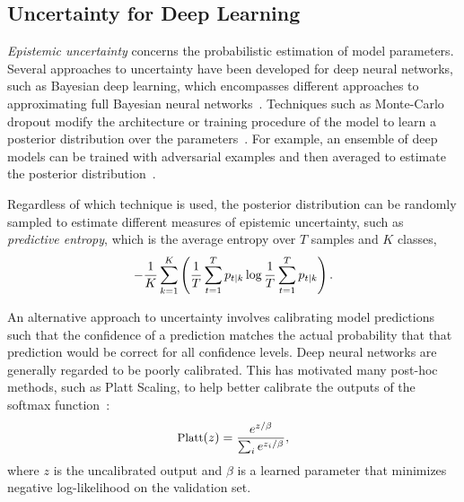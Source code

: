 \documentclass[letterpaper]{article} %
\begin{document}
    \subsection{Uncertainty for Deep Learning}
        \textit{Epistemic uncertainty} concerns the probabilistic estimation of model parameters.
        Several approaches to uncertainty have been developed for deep neural networks, such as Bayesian deep learning, which encompasses different approaches to approximating full Bayesian neural networks~\cite{Gal2016Uncertainty}.
        Techniques such as Monte-Carlo dropout modify the architecture or training procedure of the model to learn a posterior distribution over the parameters~\cite{pmlr-v48-gal16}.
        For example, an ensemble of deep models can be trained with adversarial examples and then averaged to estimate the posterior distribution~\cite{NIPS2017_9ef2ed4b}.

        Regardless of which technique is used, the posterior distribution can be randomly sampled to estimate different measures of epistemic uncertainty, such as \textit{predictive entropy}, which is the average entropy over $T$ samples and $K$ classes,
        \begin{equation}
            \label{eq:entropy}
            \small
                -\frac{1}{K} \sum_{k=1}^K \left(\frac{1}{T} \sum_{t=1}^T p_{t \mid k} \log \frac{1}{T} \sum_{t=1}^T p_{t \mid k}\right).
        \end{equation}


        An alternative approach to uncertainty involves calibrating model predictions such that the confidence of a prediction matches the actual probability that that prediction would be correct for all confidence levels.
        Deep neural networks are generally regarded to be poorly calibrated.
        This has motivated many post-hoc methods, such as Platt Scaling, to help better calibrate the outputs of the softmax function~\cite{pmlr-v70-guo17a}:
        \begin{equation}
            \label{eq:platt}
            \small
            \textrm{Platt}(z) = \frac{e^{z/\beta}}{\sum_i e^{z_i/\beta}},
        \end{equation}
        where $z$ is the uncalibrated output and $\beta$ is a learned parameter that minimizes negative log-likelihood on the validation set.
\end{document}
